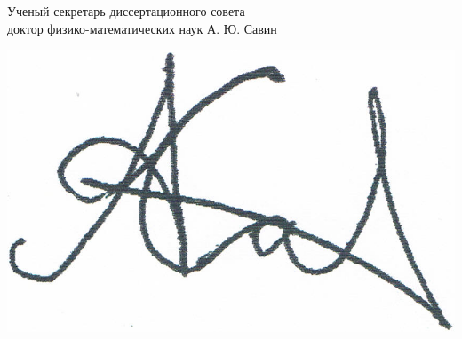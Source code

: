 \documentclass[12pt]{article}
\begin{document}
\noindent
\begin{minipage}{0.97\linewidth}
\noindent
Ученый секретарь диссертационного совета
\\
доктор физико-математических наук
\hfill
А. Ю. Савин
\end{minipage}
\nolinebreak
\hspace{-5.8cm}
\begin{minipage}{0.97\linewidth}
\includegraphics[width=0.10\linewidth]{Savin_signature.png}
\end{minipage}

\vspace{2cm} %
\end{document}
